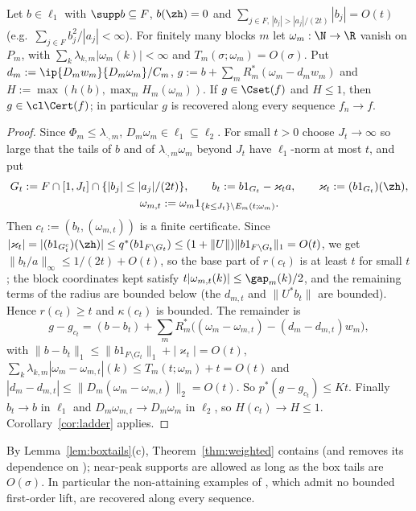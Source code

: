 \begin{theorem}\label{thm:weighted}
Let $b\in\ell_1$ with $\supp b\subseteq F$, $b(\zh)=0$ and
$\sum_{j\in F,\,|b_j|>|a_j|/(2t)}|b_j|=O(t)$ \textup{(}e.g.\
$\sum_{j\in F}b_j^2/|a_j|<\infty$\textup{)}.  For finitely many blocks $m$
let $\omega_m:\N\to\R$ vanish on $P_m$, with
$\sum_k\lambda_{k,m}|\omega_m(k)|<\infty$ and $T_m(\sigma;\omega_m)=O(\sigma)$.
Put $d_m:=\ip{D_mw_m}{D_m\omega_m}/C_m$,
$g:=b+\sum_mR_m^*(\omega_m-d_mw_m)$ and $H:=\max(h(b),\max_mH_m(\omega_m))$.
If $g\in\Cset(f)$ and $H\le1$, then $g\in\cl\Cert(f)$; in particular $g$
is recovered along every sequence $f_n\to f$.
\end{theorem}

\begin{proof}
Since $\Phi_m\le\lambda_{\cdot,m}$, $D_m\omega_m\in\ell_1\subseteq\ell_2$.
For small $t>0$ choose $J_t\to\infty$ so large that the tails of $b$ and of
$\lambda_{\cdot,m}\omega_m$ beyond $J_t$ have $\ell_1$-norm at most $t$, and
put
\begin{gather*}
 G_t:=F\cap[1,J_t]\cap\{|b_j|\le|a_j|/(2t)\},\qquad
 b_t:=b1_{G_t}-\varkappa_ta,\qquad \varkappa_t:=(b1_{G_t})(\zh),\\
 \omega_{m,t}:=\omega_m1_{\{k\le J_t\}\setminus E_m(t;\omega_m)}.
\end{gather*}
Then $c_t:=(b_t,(\omega_{m,t}))$ is a finite certificate.  Since
$|\varkappa_t|=|(b1_{G_t^c})(\zh)|\le q^*(b1_{F\setminus
G_t})\le(1+\|U\|)\|b1_{F\setminus G_t}\|_1=O(t)$, we get
$\|b_t/a\|_\infty\le1/(2t)+O(t)$, so the base part of $r(c_t)$ is at least
$t$ for small $t$; the block coordinates kept satisfy
$t|\omega_{m,t}(k)|\le\gap_m(k)/2$, and the remaining terms of the radius
are bounded below (the $d_{m,t}$ and $\|U^*b_t\|$ are bounded).  Hence
$r(c_t)\ge t$ and $\kappa(c_t)$ is bounded.  The remainder is
\[
 g-g_{c_t}=(b-b_t)+\sum_mR_m^*\big((\omega_m-\omega_{m,t})-(d_m-d_{m,t})w_m
 \big),
\]
with $\|b-b_t\|_1\le\|b1_{F\setminus G_t}\|_1+|\varkappa_t|=O(t)$,
$\sum_k\lambda_{k,m}|\omega_m-\omega_{m,t}|(k)\le T_m(t;\omega_m)+t=O(t)$ and
$|d_m-d_{m,t}|\le\|D_m(\omega_m-\omega_{m,t})\|_2=O(t)$.  So
$p^*(g-g_{c_t})\le Kt$.  Finally $b_t\to b$ in $\ell_1$ and
$D_m\omega_{m,t}\to D_m\omega_m$ in $\ell_2$, so $H(c_t)\to H\le1$.
Corollary~\ref{cor:ladder} applies.
\end{proof}

By Lemma~\ref{lem:boxtails}(c), Theorem~\ref{thm:weighted} contains
\cite[Theorem~3.1]{PrA} (and removes its dependence on \cite{Check});
near-peak supports are allowed as long as the box tails are $O(\sigma)$.
In particular the non-attaining examples of \cite[Section~3]{PrA}, which
admit no bounded first-order lift, are recovered along every sequence.


